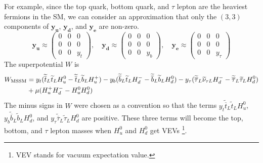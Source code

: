 \documentclass[12pt]{report}
\begin{document}
For example, since the top quark, bottom quark, and $\tau$ lepton are the heaviest fermions in the SM, we can consider an approximation that only the $(3, 3)$ components of $\mathbf{y_{u}}$, $\mathbf{y_{d}}$, and $\mathbf{y_{e}}$ are non-zero.
\begin{equation}
\mathbf{y_{u}} \approx \left( \begin{array}{ccc} 0 & 0 & 0\\ 0 & 0 & 0\\ 0 & 0 & y_{t} \end{array}\right), \quad
\mathbf{y_{d}} \approx \left( \begin{array}{ccc} 0 & 0 & 0\\ 0 & 0 & 0\\ 0 & 0 & y_{b} \end{array}\right), \quad
\mathbf{y_{e}} \approx \left( \begin{array}{ccc} 0 & 0 & 0\\ 0 & 0 & 0\\ 0 & 0 & y_{\tau} \end{array}\right)
\end{equation}
The superpotential $W$ is
\begin{align}
W_{\mathrm{MSSM}} &= 
  y_{t} (\widetilde{\overline{t}}_{L} \widetilde{t}_{L} H^{0}_{u} - \widetilde{\overline{t}}_{L} \widetilde{b}_{L} H^{+}_{u})
- y_{b} (\widetilde{\overline{b}}_{L} \widetilde{t}_{L} H^{-}_{d} - \widetilde{\overline{b}}_{L} \widetilde{b}_{L} H^{0}_{d})
- y_{\tau} (\widetilde{\overline{\tau}}_{L} \widetilde{\nu}_{\tau L} H^{-}_{d} - \widetilde{\overline{\tau}}_{L} \widetilde{\tau}_{L} H^{0}_{d}) \notag \\
& + \mu (H^{+}_{u} H^{-}_{d} - H^{0}_{u} H^{0}_{d})
\end{align}
The minus signs in $W$ were chosen as a convention so that the terms $y_{t} \widetilde{\overline{t}}_{L} \widetilde{t}_{L} H^{0}_{u}$, $y_{b} \widetilde{\overline{b}}_{L} \widetilde{b}_{L} H^{0}_{d}$, and $y_{\tau} \widetilde{\overline{\tau}}_{L} \widetilde{\tau}_{L} H^{0}_{d}$ are positive. These three terms will become the top, bottom, and $\tau$ lepton masses when $H^{0}_{u}$ and $H^{0}_{d}$ get VEVs \footnote{VEV stands for vacuum expectation value.}.
\end{document}
